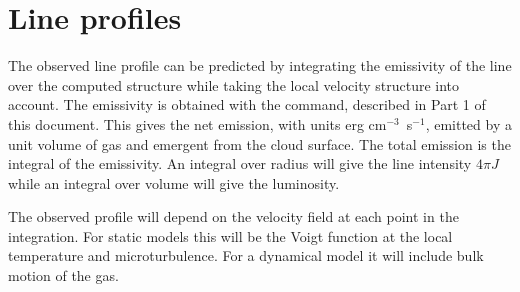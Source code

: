 \section{Line profiles}
\label{sec:obs_line_profiles}

The observed line profile can be predicted by integrating the emissivity
of the line over the computed structure while taking the local velocity
structure into account.
The emissivity is obtained with the
 command,
described in Part 1 of this document.
This gives the
net emission, with units erg cm$^{-3}$~s$^{-1}$,
emitted by a unit volume of gas and
emergent from the cloud surface.
The total emission is the integral of
the emissivity.
An integral over radius will give the line intensity $4\pi J$
while an integral over volume will give the luminosity.

The observed profile will depend on the velocity field at each point
in the integration.
For static models this will be the Voigt function at
the local temperature and microturbulence.
For a dynamical model it will
include bulk motion of the gas.


